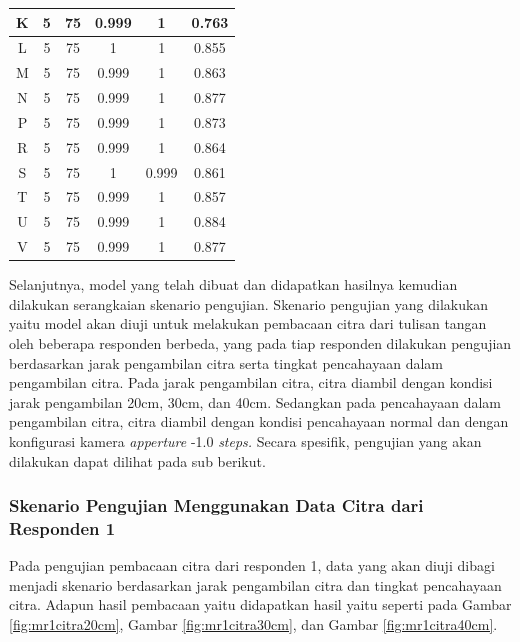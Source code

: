 \begin{center}
\begin{longtable}[c]{|c|c|c|c|c|c|}
    K      & 5      & 75     & 0.999      & 1      & 0.763    \\ \hline
    L      & 5      & 75     & 1          & 1      & 0.855    \\ \hline
    M      & 5      & 75     & 0.999      & 1      & 0.863    \\ \hline
    N      & 5      & 75     & 0.999      & 1      & 0.877    \\ \hline
    P      & 5      & 75     & 0.999      & 1      & 0.873    \\ \hline
    R      & 5      & 75     & 0.999      & 1      & 0.864    \\ \hline
    S      & 5      & 75     & 1          & 0.999  & 0.861    \\ \hline
    T      & 5      & 75     & 0.999      & 1      & 0.857    \\ \hline
    U      & 5      & 75     & 0.999      & 1      & 0.884    \\ \hline
    V      & 5      & 75     & 0.999      & 1      & 0.877    \\ \hline 
  \end{longtable}
\end{center}

Selanjutnya, model yang telah dibuat dan didapatkan hasilnya kemudian dilakukan serangkaian skenario pengujian. Skenario pengujian yang dilakukan yaitu model akan diuji untuk melakukan pembacaan citra dari tulisan tangan oleh beberapa responden berbeda, yang pada tiap responden dilakukan pengujian berdasarkan jarak pengambilan citra serta tingkat pencahayaan dalam pengambilan citra. Pada jarak pengambilan citra, citra diambil dengan kondisi jarak pengambilan 20cm, 30cm, dan 40cm. Sedangkan pada pencahayaan dalam pengambilan citra, citra diambil dengan kondisi pencahayaan normal dan dengan konfigurasi kamera \textit{apperture} -1.0 \textit{steps.} Secara spesifik, pengujian yang akan dilakukan dapat dilihat pada sub berikut.

\subsubsection{Skenario Pengujian Menggunakan Data Citra dari Responden 1}
\label{subsubsec:mskenarioresponden1}

Pada pengujian pembacaan citra dari responden 1, data yang akan diuji dibagi menjadi skenario berdasarkan jarak pengambilan citra dan tingkat pencahayaan citra. Adapun hasil pembacaan yaitu didapatkan hasil yaitu seperti pada Gambar \ref*{fig:mr1citra20cm}, Gambar \ref*{fig:mr1citra30cm}, dan Gambar \ref*{fig:mr1citra40cm}.

